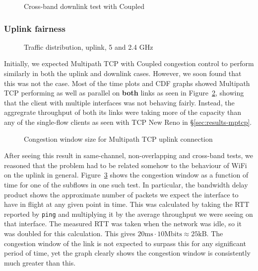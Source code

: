 \begin{figure}[h]
 \centering
 
 \caption{Cross-band downlink test with Coupled}\label{graph:cb-fairness-down}
\end{figure}

\subsubsection{Uplink fairness}

\begin{figure}[h]
 \centering
 
 \caption{Traffic distribution, uplink, 5 and 2.4 GHz}\label{graph:up-fair}
\end{figure}

Initially, we expected Multipath TCP with Coupled congestion control to perform
similarly in both the uplink and downlink cases. However, we soon found
that this was not the case. Most of the time plots and CDF graphs showed 
Multipath TCP performing as well as parallel on \textbf{both} links as seen in
Figure~\ref{graph:up-fair}, showing that the client with multiple interfaces was
not behaving fairly. Instead, the aggregrate throughput of both its links were taking more of the capacity than any of the single-flow clients as seen with TCP New Reno in \S\ref{sec:results-mptcp}.

\begin{figure}[h]
 \centering
 
 \caption{Congestion window size for Multipath TCP uplink connection}\label{graph:fairness-up-close}
\end{figure}

After seeing this result in same-channel, non-overlapping and cross-band  
tests, we reasoned that the problem had to be related somehow to the 
behaviour of WiFi on the uplink in general. Figure~\ref{graph:fairness-up-close} 
shows the congestion window as a function of time for one of the subflows in one 
such test. In particular, the bandwidth delay product shows the approximate number of packets
we expect the interface to have in flight at any given point in time. This was
calculated by taking the RTT reported by \texttt{ping} and multiplying it by the
average throughput we were seeing on that interface. The measured RTT was taken
when the network was idle, so it was doubled for this calculation. This gives
$20\text{ms} \cdot 10\text{Mbits} \approx 25\text{kB}$. The congestion window of
the link is not expected to surpass this for any significant period of time, yet
the graph clearly shows the congestion window is consistently much greater than
this.

